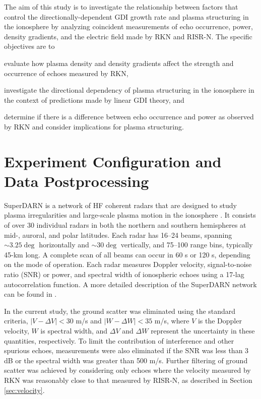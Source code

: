 The aim of this study is to investigate the relationship between factors that control the directionally-dependent GDI growth rate and plasma structuring in the ionosphere by analyzing coincident measurements of echo occurrence, power, density gradients, and the electric field made by RKN and RISR-N.  The specific objectives are to 
\begin{enumerate*}[label={(\arabic*)}]
	\item evaluate how plasma density and density gradients affect the strength and occurrence of echoes measured by RKN,
	\item investigate the directional dependency of plasma structuring in the ionosphere in the context of predictions made by linear GDI theory, and
	\item determine if there is a difference between echo occurrence and power as observed by RKN and consider implications for plasma structuring.
\end{enumerate*}

	
\section{Experiment Configuration and Data Postprocessing}
\label{sec:experiment}
SuperDARN is a network of HF coherent radars that are designed to study plasma irregularities and large-scale plasma motion in the ionosphere \citep{Chisham2007}.  It consists of over 30 individual radars in both the northern and southern hemispheres at \mbox{mid-,} auroral, and polar latitudes.  Each radar has 16--24 beams, spanning \(\sim3.25\deg\) horizontally and \(\sim30\deg\) vertically, and 75--100 range bins, typically 45-km long.  A complete scan of all beams can occur in 60 s or 120 s, depending on the mode of operation.  Each radar measures Doppler velocity, signal-to-noise ratio (SNR) or power, and spectral width of ionospheric echoes using a 17-lag autocorrelation function.  A more detailed description of the SuperDARN network can be found in \citet{Chisham2007}.

In the current study, the ground scatter was eliminated using the standard criteria, \(|V-\Delta V| < 30\) m/s and \(|W-\Delta W| < 35\) m/s, where \(V\) is the Doppler velocity, \(W\) is spectral width, and \(\Delta V\) and \(\Delta W\) represent the uncertainty in these quantities, respectively.  To limit the contribution of interference and other spurious echoes, measurements were also eliminated if the SNR was less than 3 dB or the spectral width was greater than 500 m/s.  Further filtering of ground scatter was achieved by considering only echoes where the velocity measured by RKN was reasonably close to that measured by RISR-N, as described in Section \ref{sec:velocity}.

